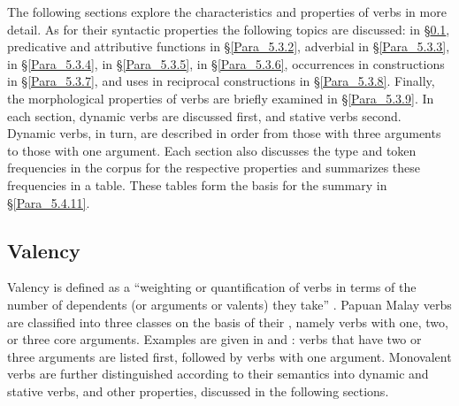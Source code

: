 The following sections explore the characteristics and properties of verbs in more detail. As for their syntactic properties the following topics are discussed:  in §\ref{Para_5.3.1}, predicative and attributive functions in §\ref{Para_5.3.2}, adverbial  in §\ref{Para_5.3.3},  in §\ref{Para_5.3.4},  in §\ref{Para_5.3.5},  in §\ref{Para_5.3.6}, occurrences in  constructions in §\ref{Para_5.3.7}, and uses in reciprocal constructions in §\ref{Para_5.3.8}. Finally, the morphological properties of verbs are briefly examined in §\ref{Para_5.3.9}. In each section, dynamic verbs are discussed first, and stative verbs second. Dynamic verbs, in turn, are described in order from those with three arguments to those with one argument. Each section also discusses the type and token frequencies in the corpus for the respective properties and summarizes these frequencies in a table. These tables form the basis for the summary in §\ref{Para_5.4.11}.


\subsection{Valency}
\label{Para_5.3.1}
Valency is defined as a “weighting or quantification of verbs in terms of the number of dependents (or arguments or valents) they take” \citep[5185]{Asher.1994}. Papuan Malay verbs are classified into three classes on the basis of their , namely verbs with one, two, or three core arguments. Examples are given in  and : verbs that have two or three arguments are listed first, followed by verbs with one argument. Monovalent verbs are further distinguished according to their semantics into dynamic and stative verbs, and other properties, discussed in the following sections.


